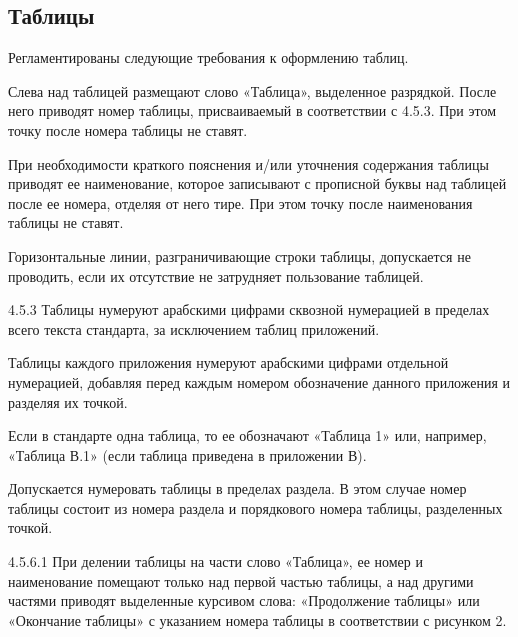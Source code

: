 \documentclass[12pt, twoside, final]{ruost}
\begin{document}
\begin{OST}
			\subsection{Таблицы}\label{sec:tables}
			
				\point Регламентированы следующие требования к оформлению таблиц.
				
					\begin{stdquote}
						\par Слева над таблицей размещают слово «Таблица», выделенное разрядкой. После него приводят номер таблицы, присваиваемый в соответствии с 4.5.3. При этом точку после номера таблицы не ставят.
						\par При необходимости краткого пояснения и/или уточнения содержания таблицы приводят ее наименование, которое записывают с прописной буквы над таблицей после ее номера, отделяя от него тире. При этом точку после наименования таблицы не ставят.
						\par Горизонтальные линии, разграничивающие строки таблицы, допускается не проводить, если их отсутствие не затрудняет пользование таблицей.
						\par [ГОСТ 1.5---2001, пункт 4.5.2]
					\end{stdquote}
					
					\begin{stdquote}
						\par 4.5.3 Таблицы нумеруют арабскими цифрами сквозной нумерацией в пределах всего текста стандарта, за исключением таблиц приложений.
						\par Таблицы каждого приложения нумеруют арабскими цифрами отдельной нумерацией, добавляя перед каждым номером обозначение данного приложения и разделяя их точкой.
						\par Если в стандарте одна таблица, то ее обозначают «Таблица 1» или, например, «Таблица В.1» (если таблица приведена в приложении В).
						\par Допускается нумеровать таблицы в пределах раздела. В этом случае номер таблицы состоит из номера раздела и порядкового номера таблицы, разделенных точкой.
						\par [ГОСТ 1.5---2001]
					\end{stdquote}
					
					\begin{stdquote}
						\par 4.5.6.1 При делении таблицы на части слово «Таблица», ее номер и наименование помещают только над первой частью таблицы, а над другими частями приводят выделенные курсивом слова: «Продолжение таблицы» или «Окончание таблицы» с указанием номера таблицы в соответствии с рисунком 2.
						\par [ГОСТ 1.5---2001]
					\end{stdquote}
					

\end{OST}
\end{document}

